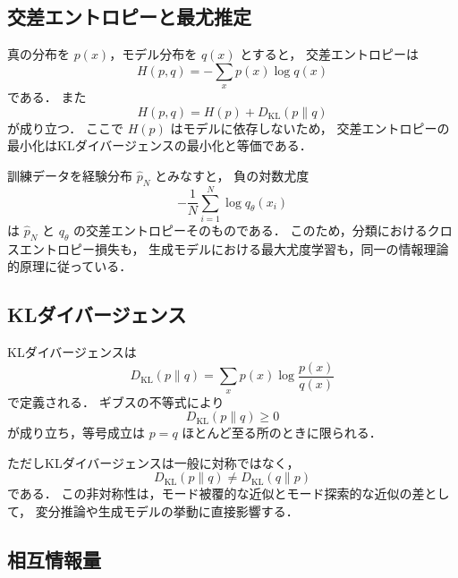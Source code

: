 \subsection{交差エントロピーと最尤推定}

真の分布を $p(x)$，モデル分布を $q(x)$ とすると，
交差エントロピーは
\begin{equation}
  H(p,q)
  =
  -\sum_{x} p(x)\log q(x)
  \label{eq:cross-entropy}
\end{equation}
である．
また
\begin{equation}
  H(p,q)
  =
  H(p) + D_{\mathrm{KL}}(p\|q)
  \label{eq:cross-entropy-kl}
\end{equation}
が成り立つ．
ここで $H(p)$ はモデルに依存しないため，
交差エントロピーの最小化はKLダイバージェンスの最小化と等価である．

訓練データを経験分布 $\hat{p}_{N}$ とみなすと，
負の対数尤度
\begin{equation}
  -\frac{1}{N}\sum_{i=1}^{N}\log q_{\theta}(x_i)
  \label{eq:empirical-cross-entropy}
\end{equation}
は $\hat{p}_{N}$ と $q_{\theta}$ の交差エントロピーそのものである．
このため，分類におけるクロスエントロピー損失も，
生成モデルにおける最大尤度学習も，同一の情報理論的原理に従っている．

\subsection{KLダイバージェンス}

KLダイバージェンスは
\begin{equation}
  D_{\mathrm{KL}}(p\|q)
  =
  \sum_{x} p(x)\log\frac{p(x)}{q(x)}
  \label{eq:kl}
\end{equation}
で定義される\cite{Kullback1951}．
ギブスの不等式により
\begin{equation}
  D_{\mathrm{KL}}(p\|q) \geq 0
  \label{eq:kl-nonnegative}
\end{equation}
が成り立ち，等号成立は $p=q$ ほとんど至る所のときに限られる．

ただしKLダイバージェンスは一般に対称ではなく，
\begin{equation}
  D_{\mathrm{KL}}(p\|q) \neq D_{\mathrm{KL}}(q\|p)
  \label{eq:kl-asymmetry}
\end{equation}
である．
この非対称性は，モード被覆的な近似とモード探索的な近似の差として，
変分推論や生成モデルの挙動に直接影響する．

\subsection{相互情報量}

